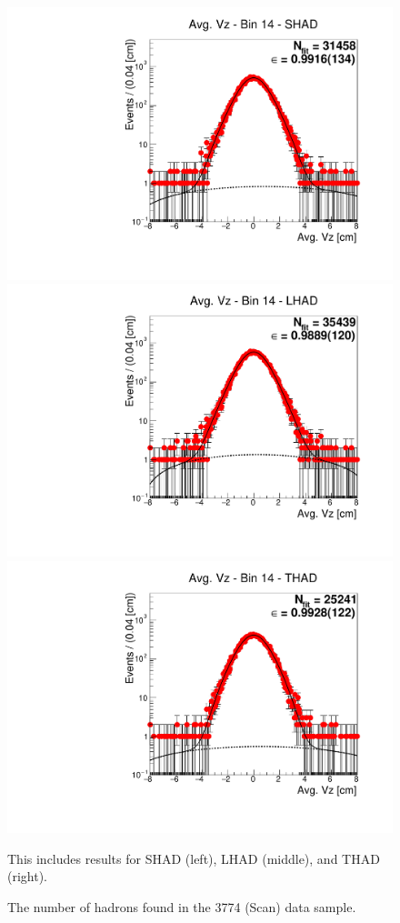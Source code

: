\begin{figure}[H]
\centering
\includegraphics[scale=0.25]{figures/plots/nonDDbar_fit_results/scan/fit_scan_14_data_SHAD.pdf}
\hspace{-0.5cm}
\includegraphics[scale=0.25]{figures/plots/nonDDbar_fit_results/scan/fit_scan_14_data_LHAD.pdf}
\hspace{-0.5cm}
\includegraphics[scale=0.25]{figures/plots/nonDDbar_fit_results/scan/fit_scan_14_data_THAD.pdf}
\caption{The number of hadrons found in the 3774 (Scan) data sample.}
{This includes results for SHAD (left), LHAD (middle), and THAD (right).}
\label{fig:hadron_fits_scan_14}
\end{figure}

